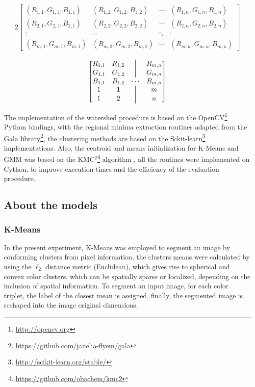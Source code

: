 \documentclass[10pt,twocolumn,letterpaper]{article}
\newcommand*{\vertbar}{\rule[-1ex]{0.5pt}{3.0ex}}
\begin{document}
\begin{widetext}
	\begin{alignat}{2}
	\begin{bmatrix}
	(R_{1,1}, G_{1,1}, B_{1,1}) & (R_{1,2}, G_{1,2}, B_{1,2}) & \cdots & (R_{1,n}, G_{1,n}, B_{1,n}) \\
	(R_{2,1}, G_{2,1}, B_{2,1}) & (R_{2,2}, G_{2,2}, B_{2,2}) & \cdots & (R_{2,n}, G_{2,n}, B_{2,n}) \\
	\vdots & \cdots & \ddots & \vdots \\
	(R_{m,1}, G_{m,1}, B_{m,1}) & (R_{m,2}, G_{m,2}, B_{m,2}) & \cdots & (R_{m,n}, G_{m,n}, B_{m,n})
	\end{bmatrix} \label{eq:rgbim}
	\end{alignat} 
	
	\begin{alignat}{2}
	\begin{bmatrix}
	R_{1,1} & R_{1,2} & \vertbar & R_{m,n} \\
	G_{1,1} & G_{1,2} & \vertbar & G_{m,n} \\
	B_{1,1} & B_{1,2} & \cdots & B_{m,n} \\
	1 & 1 & \vertbar & m \\
	1 & 2 & \vertbar & n
	\end{bmatrix} \label{eq:repr}
	\end{alignat} 
	
\end{widetext}   

The implementation of the watershed procedure is based on the OpenCV\footnote{\url{http://opencv.org}} Python bindings, with the regional minima extraction routines adapted from the Gala library\footnote{\url{https://github.com/janelia-flyem/gala}}, the clustering methods are based on the Sckit-learn\footnote{\url{http://scikit-learn.org/stable/}} implementations. Also, the centroid and means initialization for K-Means and GMM was based on the KMC$^{2}$\footnote{\url{https://github.com/obachem/kmc2}} algorithm \cite{Bachem:2016:AKS:3016100.3016103}, all the routines were implemented on Cython, to improve execution times and the efficiency of the evaluation procedure.



\subsection*{About the models}
\subsubsection*{K-Means}
In the present experiment, K-Means was employed to segment an image by conforming clusters from pixel information, the clusters means were calculated by using the $\ell_2$ distance metric (Euclidean), which gives rise to spherical and convex color clusters, which can be spatially sparse or localized, depending on the inclusion of spatial information. To segment an input image, for each color triplet, the label of the closest mean is assigned, finally, the segmented image is reshaped into the image original dimensions.
\end{document}
